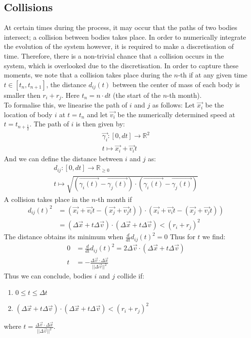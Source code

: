 \subsection{Collisions}
At certain times during the process, it may occur that the paths of two bodies intersect; a collision between bodies takes place. In order to numerically integrate the evolution of the system however, it is required to make a discretisation of time.
 Therefore, there is a non-trivial chance that a collision occurs in the system, which is overlooked due to the discretisation.
 In order to capture these moments, we note that a collision takes place during the \(n\)-th if at any given time \(t\in[t_{n},t_{n+1}]\), the distance \(d_{ij}(t)\) between the center of mass of each body is smaller then \(r_i+r_j\). 
 Here \(t_n=n\cdot dt\) (the start of the \(n\)-th month).
\\
 To formalise this, we linearise the path of \(i\) and \(j\) as follows: 
 Let \(\vec{x_i}\) be the location of body \(i\) at \(t=t_n\) and let \(\vec{v_i}\) be the numerically determined speed at \(t=t_{n+\frac{1}{2}}\).
The path of \(i\) is then given by:
\begin{align*}
\vec{\gamma_i}:[0,dt]\rightarrow\mathbb{R}^2 \\
t\mapsto \vec{x_i}+\vec{v_i}t
\end{align*}
And we can define the distance between \(i\) and \(j\) as:
\begin{align*}
	d_{ij}:[0,dt]\rightarrow \mathbb{R}_{\geq 0}\\
	t\mapsto \sqrt{(\vec{\gamma_i(t)}-\vec{\gamma_j(t)})\cdot(\vec{\gamma_i(t)}-\vec{\gamma_j(t)})}
\end{align*}
 A collision takes place in the \(n\)-th month if 
 \begin{align*}
	d_{ij}(t)^2&=(\vec{x_i}+\vec{v_i}t-(\vec{x_j}+\vec{v_j}t))\cdot (\vec{x_i}+\vec{v_i}t-(\vec{x_j}+\vec{v_j}t))\\
	&= (\Delta\vec{x} +t\Delta\vec{v})\cdot(\Delta\vec{x} +t\Delta\vec{v})<(r_i+r_j)^2
 \end{align*}
  The distance obtains its minimum when \(\frac{d}{dt}d_{ij}(t)^2=0\) Thus for \(t\) we find:
  \begin{align*}
  0&=\frac{d}{dt}d_{ij}(t)^2 =2\Delta\vec{v}\cdot(\Delta\vec{x}+t\Delta\vec{v})\\
  t&=-\frac{\Delta\vec{v}\cdot \Delta\vec{x}}{||\Delta \vec{v}||^2}
  \end{align*}
  Thus we can conclude, bodies \(i\) and \(j\) collide if:
 \begin{enumerate}
  \item \(0\leq t \leq \Delta t\) 
  \item \((\Delta\vec{x} +t\Delta\vec{v})\cdot(\Delta\vec{x} +t\Delta\vec{v}) <(r_i+r_j)^2\)
\end{enumerate} 
where \(t= \frac{\Delta\vec{v}\cdot \Delta\vec{x}}{||\Delta \vec{v}||^2}\).

